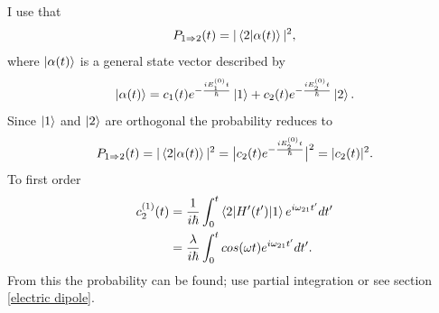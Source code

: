 \begin{example}
\begin{enumerate}
		I use that
		\begin{equation}
			P_{1\Rightarrow 2}(t)=|\braket{2|\alpha(t)}|^2,
		\end{equation} 		
		where $\ket{\alpha(t)}$ is a general state vector described by
		\begin{equation}
			\ket{\alpha(t)}=c_1(t)e^{-\frac{iE_1^{(0)}t}{\hbar}}\ket{1}+c_2(t)e^{-\frac{iE_2^{(0)}t}{\hbar}}\ket{2}.
		\end{equation} 
		Since $\ket{1}$ and $\ket{2}$ are orthogonal the probability reduces to
		\begin{equation}
			P_{1\Rightarrow 2}(t)=|\braket{2|\alpha(t)}|^2=\big|c_2(t)e^{-\frac{iE_2^{(0)}t}{\hbar}}\big|^2=|c_2(t)|^2.
		\end{equation} 
		To first order
		\begin{equation}
			\begin{split}
				c_2^{(1)}(t)&=\frac{1}{i\hbar}\int_{0}^{t}\braket{2|H'(t')|1}e^{i\omega_{21}t'}dt'\\
				&=\frac{\lambda}{i\hbar}\int_{0}^{t}cos(\omega t)e^{i\omega_{21}t'}dt'.\\
			\end{split}
		\end{equation} 
		From this the probability can be found; use partial integration or see section \ref{electric dipole}.
		
	\end{enumerate}
\end{example}

